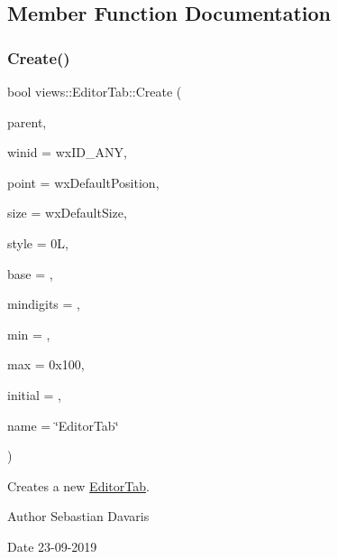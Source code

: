 \subsection{Member Function Documentation}
\mbox{\label{classviews_1_1_editor_tab_a068d03e26a3396fe95d881a09bb5ad2f}} 
\subsubsection{\texorpdfstring{Create()}{Create()}}
{\footnotesize\ttfamily bool views\+::\+Editor\+Tab\+::\+Create (\begin{DoxyParamCaption}\item[{wx\+Window $\ast$}]{parent,  }\item[{wx\+Window\+ID}]{winid = {\ttfamily wxID\+\_\+ANY},  }\item[{const wx\+Point \&}]{point = {\ttfamily wxDefaultPosition},  }\item[{const wx\+Size \&}]{size = {\ttfamily wxDefaultSize},  }\item[{long}]{style = {\ttfamily 0L},  }\item[{unsigned int}]{base = {},  }\item[{unsigned int}]{mindigits = {},  }\item[{int}]{min = {},  }\item[{int}]{max = {\ttfamily 0x100},  }\item[{int}]{initial = {},  }\item[{const wx\+String \&}]{name = {\ttfamily \char`\"{}EditorTab\char`\"{}} }\end{DoxyParamCaption})}

Creates a new \hyperlink{classviews_1_1_editor_tab}{Editor\+Tab}. \begin{DoxyAuthor}{Author}
Sebastian Davaris 
\end{DoxyAuthor}
\begin{DoxyDate}{Date}
23-\/09-\/2019 
\end{DoxyDate}

